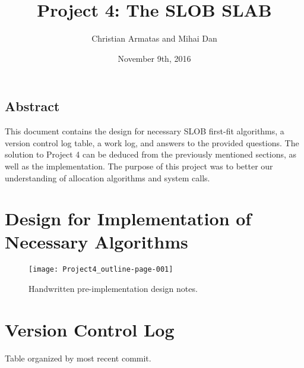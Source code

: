 \documentclass[letterpaper,10pt,onecolumn]{IEEEtran}
\title{Project 4: The SLOB SLAB}
\author{Christian Armatas and Mihai Dan}
\date{November 9th, 2016}
\begin{document}
    \begin{center}
        \begin{minipage}[h]{\textwidth}
            \maketitle
        \end{minipage}
    \end{center}
    
    \vspace{140mm}
    
    \begin{center}
        \section*{Abstract}
        This document contains the design for necessary SLOB first-fit algorithms, a version control log table, a work log, and answers to the provided questions. The solution to Project 4 can be deduced from the previously mentioned sections, as well as the implementation. The purpose of this project was to better our understanding of allocation algorithms and system calls.
    \end{center}
    
    
    \newpage
    
    
    \section*{Design for Implementation of Necessary Algorithms}
    
    \begin{figure}[h]
        \texttt{[image: Project4\_outline-page-001]}
        \centering
        \captionsetup{justification=centering}
        \caption{Handwritten pre-implementation design notes.}
    \end{figure}
  

    \newpage
    
    
    \section*{Version Control Log}
        \begin{center}
            Table organized by most recent commit.
        \end{center}
        
        \vspace{0.5mm}
        
\end{document}
